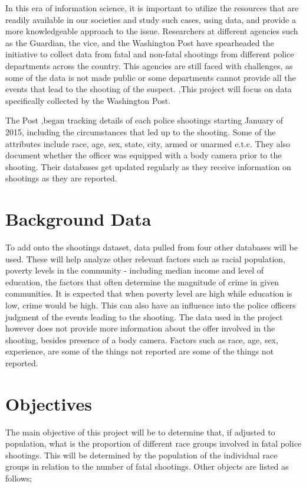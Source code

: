\documentclass[a4paper,12pt]{article}
\begin{document}
In this era of information science, it is important to utilize the resources that are readily available in our societies and study such cases, using data, and provide a more knowledgeable approach to the issue. Researchers at different agencies such as the Guardian, the vice, and the Washington Post have spearheaded the initiative to collect data from fatal and non-fatal shootings from different police departments across the country. This agencies are still faced with challenges, as some of the data is not made public or some departments cannot provide all the events that lead to the shooting of the suspect. \cite{fatal_force},This project will focus on data specifically collected by the Washington Post. 

The Post \cite{washington_post},began tracking details of each police shootings starting January of 2015, including the circumstances that led up to the shooting. Some of the attributes include race, age, sex, state, city, armed or unarmed e.t.c. They also document whether the officer was equipped with a body camera prior to the shooting. Their databases get updated regularly as they receive information on shootings as they are reported.

\section*{Background Data}
To add onto the shootings dataset, data pulled from four other databases will be used. These will help analyze other relevant factors such as racial population, poverty levels in the community - including median income and level of education, the factors that often determine the magnitude of crime in given communities. \cite{deadly_force} It is expected that when poverty level are high while education is low, crime would be high. This can also have an influence into the police officers judgment of the events leading to the shooting. 
The data used in the project however does not provide more information about the offer involved in the shooting, besides presence of a body camera. Factors such as race, age, sex, experience, are some of the things not reported are some of the things not reported.

\section*{Objectives}
The main objective of this project will be to determine that, if adjusted to population, what is the proportion of different race groups involved in fatal police shootings. This will be determined by the population of the individual race groups in relation to the number of fatal shootings. Other objects are listed as follows;
\end{document}
